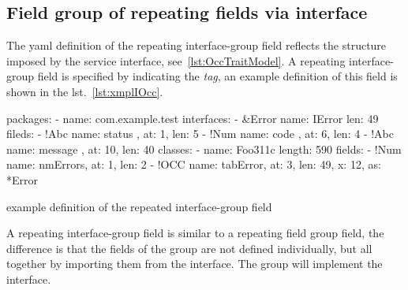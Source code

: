 \documentclass[a4paper,10pt]{report}
\newenvironment{elisting}[1][H]
  {\captionsetup{aboveskip=0pt}\begin{listing}[#1]}
  {\end{listing}%
}
\begin{document}
\subsection{Field group of repeating fields via interface} \label{sub:yaml.iocc}
The yaml definition of the repeating interface-group field reflects the 
structure imposed by the service interface, see~\ref{lst:OccTraitModel}. 
A repeating interface-group field is specified by indicating the 
 \textsl{tag}, an example definition 
of this field is shown in the lst.~\ref{lst:xmplIOcc}.

\begin{elisting}[!htb]
\begin{yamlcode}
packages:
  - name: com.example.test
    interfaces:
      - &Error
        name: IError
        len: 49
        fileds:
          - !Abc { name: status  , at:  1, len:  5}
          - !Num { name: code    , at:  6, len:  4}
          - !Abc { name: message , at: 10, len: 40}
    classes:
      - name: Foo311c
        length: 590
        fields:
          - !Num { name: nmErrors, at: 1, len: 2}
          - !OCC { name: tabError, at: 3, len: 49, x: 12, as: *Error }
\end{yamlcode}
\caption{example definition of the repeated interface-group field}
\label{lst:xmplIOcc}
\end{elisting}
A repeating interface-group field is similar to a repeating field group field, 
the difference is that the fields of the group are not defined individually, but 
all together by importing them from the interface. The group will implement the 
interface.
\end{document}
